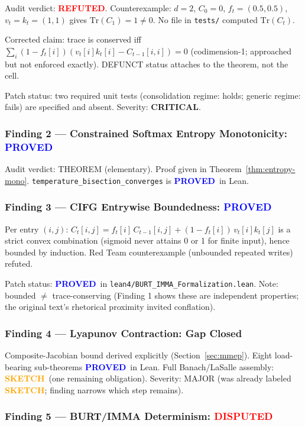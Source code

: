 \documentclass[11pt,letterpaper]{article}
\newcommand{\PROVED}{\textbf{\textcolor{blue}{PROVED}}}
\newcommand{\SKETCH}{\textbf{\textcolor{orange}{SKETCH}}}
\newcommand{\REFUTED}{\textbf{\textcolor{red}{REFUTED}}}
\newcommand{\DISPUTED}{\textbf{\textcolor{red}{DISPUTED}}}
\begin{document}
Audit verdict: \REFUTED.  Counterexample: $d=2$, $C_0=0$,
$f_t=(0.5,0.5)$, $v_t=k_t=(1,1)$ gives $\mathrm{Tr}(C_1)=1 \neq 0$.
No file in \texttt{tests/} computed $\mathrm{Tr}(C_t)$.

Corrected claim: trace is conserved iff
$\sum_i (1-f_t[i])(v_t[i]k_t[i] - C_{t-1}[i,i]) = 0$
(codimension-1; approached but not enforced exactly).
DEFUNCT status attaches to the theorem, not the cell.

Patch status: two required unit tests (consolidation regime: holds;
generic regime: fails) are specified and absent.
Severity: \textbf{CRITICAL}.

\subsubsection*{Finding 2 --- Constrained Softmax Entropy Monotonicity: \PROVED}

Audit verdict: THEOREM (elementary).  Proof given in
Theorem~\ref{thm:entropy-mono}.
\texttt{temperature\_bisection\_converges} is \PROVED\ in Lean.

\subsubsection*{Finding 3 --- CIFG Entrywise Boundedness: \PROVED}

Per entry $(i,j)$: $C_t[i,j] = f_t[i]\,C_{t-1}[i,j] + (1-f_t[i])\,v_t[i]k_t[j]$
is a strict convex combination (sigmoid never attains 0 or 1 for finite input),
hence bounded by induction.  Red Team counterexample (unbounded repeated writes)
refuted.

Patch status: \PROVED\ in \texttt{lean4/BURT\_IMMA\_Formalization.lean}.
Note: bounded $\neq$ trace-conserving (Finding 1 shows these are independent
properties; the original text's rhetorical proximity invited conflation).

\subsubsection*{Finding 4 --- Lyapunov Contraction: Gap Closed}

Composite-Jacobian bound derived explicitly (Section~\ref{sec:mmep}).
Eight load-bearing sub-theorems \PROVED\ in Lean.
Full Banach/LaSalle assembly: \SKETCH\ (one remaining obligation).
Severity: MAJOR (was already labeled \SKETCH; finding narrows which step remains).

\subsubsection*{Finding 5 --- BURT/IMMA Determinism: \DISPUTED}
\end{document}
